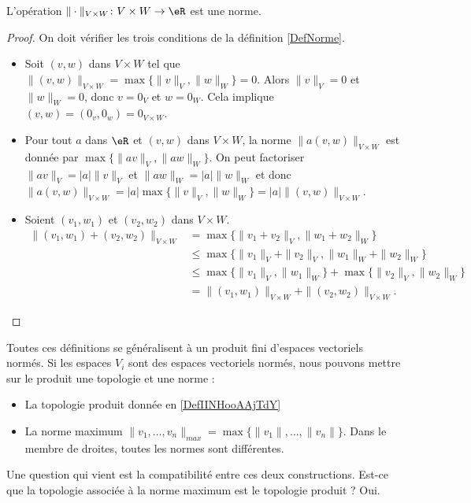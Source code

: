 \begin{lemma}
	L'opération $\|\cdot \|_{V\times W}\colon V\times W\to \eR$ est une norme.
\end{lemma}

\begin{proof}
	On doit vérifier les trois conditions de la définition \ref{DefNorme}.
	\begin{itemize}
		\item Soit $(v,w)$ dans $V\times W$ tel que $\|(v,w)\|_{V\times W}=\max\{\|v\|_{V},\|w\|_W\}=0$. Alors $\|v\|_V=0$ et $\|w\|_W=0$, donc $v=0_V$ et $w=0_W$. Cela implique $(v,w)=(0_v,0_w)=0_{V\times W}$. 
		\item Pour tout $a$ dans $\eR$ et $(v,w)$ dans $V\times W$,  la norme $\|a (v,w)\|_{V\times W}$ est donnée par  $\max\{\|av\|_{V},\|aw\|_W\}$. On peut factoriser $\|av\|_{V}=|a|\|v\|_{V}$ et $\|aw\|_W=|a|\|w\|_W$ et donc $\|a (v,w)\|_{V\times W}=|a|\max\{\|v\|_{V},\|w\|_W\}=|a|\|(v,w)\|_{V\times W}$.
		\item Soient $(v_1,w_1)$ et $(v_2,w_2)$ dans $V\times W$. 
		\begin{equation}
			\begin{aligned}
				\|(v_1,w_1)+(v_2,w_2)\|_{V\times W}&=\max\{\|v_1+v_2\|_{V},\|w_1+w_2\|_W\}\\
				&\leq \max\{\|v_1\|_V+\|v_2\|_{V},\|w_1\|_W+\|w_2\|_W\}\\
				&\leq\max\{\|v_1\|_V,\|w_1\|_W\}+ \max\{\|v_2\|_{V},\|w_2\|_W\}\\
				&=\|(v_1,w_1)\|_{V\times W}+\|(v_2,w_2)\|_{V\times W}.
			\end{aligned}
		\end{equation}
	\end{itemize} 
\end{proof}

Toutes ces définitions se généralisent à un produit fini d'espaces vectoriels normés. Si les espaces \( V_i\) sont des espaces vectoriels normés, nous pouvons mettre sur le produit une topologie et une norme :
\begin{itemize}
    \item La topologie produit donnée en \ref{DefIINHooAAjTdY}
    \item La norme maximum \( \| v_1,\ldots, v_n \|_{max}=\max\{ \| v_1 \|,\ldots, \| v_n \| \}\). Dans le membre de droites, toutes les normes sont différentes.
\end{itemize}
Une question qui vient est la compatibilité entre ces deux constructions. Est-ce que la topologie associée à la norme maximum est le topologie produit ? Oui.

